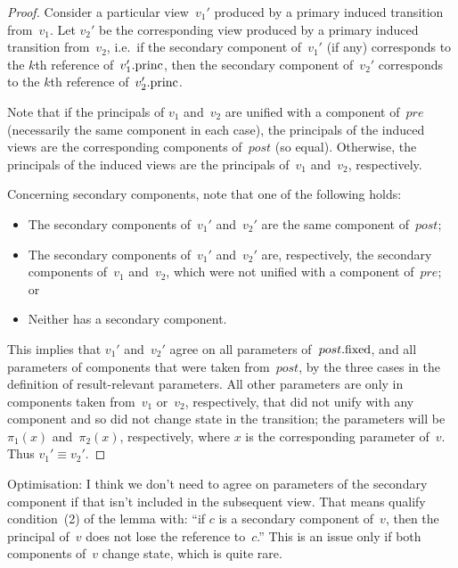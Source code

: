 \begin{proof}
Consider a particular view~$v_1'$ produced by a primary induced transition
from~$v_1$.  Let $v_2'$ be the corresponding view produced by a primary
induced transition from~$v_2$, i.e.~if the secondary component of~$v_1'$ (if
any) corresponds to the $k$th reference of~$v_1'.\mathrm{princ}$, then the secondary
component of~$v_2'$ corresponds to the $k$th reference of~$v_2'.\mathrm{princ}$.

Note that if the principals of $v_1$ and~$v_2$ are unified with a component
of~$pre$ (necessarily the same component in each case), the principals of the
induced views are the corresponding components of~$post$ (so equal).
Otherwise, the principals of the induced views are the principals of~$v_1$
and~$v_2$, respectively. 

Concerning secondary components, note that one of the following holds:
%
\begin{itemize}
\item The secondary components of~$v_1'$ and~$v_2'$ are the same component
  of~$post$; 

\item The secondary components of~$v_1'$ and~$v_2'$ are, respectively, the
  secondary components of~$v_1$ and~$v_2$, which were not unified with a
  component of~$pre$; or

\item Neither has a secondary component.
\end{itemize}

This implies that $v_1'$ and~$v_2'$ agree on all parameters of~$post.\mathrm{fixed}$,
and all parameters of components that were taken from~$post$, by the three
cases in the definition of result-relevant parameters.  All other parameters
are only in components taken from~$v_1$ or~$v_2$, respectively, that did not
unify with any component and so did not change state in the transition; the
parameters will be $\pi_1(x)$ and~$\pi_2(x)$, respectively, where $x$ is the
corresponding parameter of~$v$.  Thus $v_1' \equiv v_2'$.
\end{proof}

Optimisation: I think we don't need to agree on parameters of the secondary
component if that isn't included in the subsequent view.  That means qualify
condition~(2) of the lemma with: ``if $c$ is a secondary component of~$v$,
then the principal of~$v$ does not lose the reference to~$c$.''  This is an
issue only if both components of~$v$ change state, which is quite rare.



